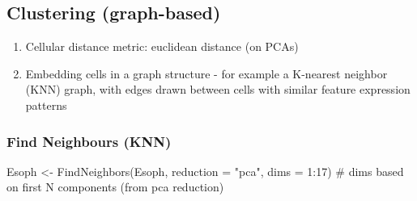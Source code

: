 \documentclass[
  letterpaper,
  DIV=11,
  numbers=noendperiod]{scrreprt}
\newenvironment{Shaded}{\begin{snugshade}}{\end{snugshade}}
\newcommand{\AttributeTok}[1]{\textcolor[rgb]{0.40,0.45,0.13}{#1}}
\newcommand{\CommentTok}[1]{\textcolor[rgb]{0.37,0.37,0.37}{#1}}
\newcommand{\ConstantTok}[1]{\textcolor[rgb]{0.56,0.35,0.01}{#1}}
\newcommand{\ControlFlowTok}[1]{\textcolor[rgb]{0.00,0.23,0.31}{\textbf{#1}}}
\newcommand{\DecValTok}[1]{\textcolor[rgb]{0.68,0.00,0.00}{#1}}
\newcommand{\FloatTok}[1]{\textcolor[rgb]{0.68,0.00,0.00}{#1}}
\newcommand{\FunctionTok}[1]{\textcolor[rgb]{0.28,0.35,0.67}{#1}}
\newcommand{\NormalTok}[1]{\textcolor[rgb]{0.00,0.23,0.31}{#1}}
\newcommand{\OtherTok}[1]{\textcolor[rgb]{0.00,0.23,0.31}{#1}}
\newcommand{\SpecialCharTok}[1]{\textcolor[rgb]{0.37,0.37,0.37}{#1}}
\newcommand{\StringTok}[1]{\textcolor[rgb]{0.13,0.47,0.30}{#1}}
\providecommand{\tightlist}{%
  \setlength{\itemsep}{0pt}\setlength{\parskip}{0pt}}\usepackage{longtable,booktabs,array}
\begin{document}
\begin{Shaded}
\end{Shaded}

\subsection{Clustering (graph-based)}\label{clustering-graph-based}

\begin{enumerate}
\def\labelenumi{\arabic{enumi}.}
\tightlist
\item
  Cellular distance metric: euclidean distance (on PCAs)
\item
  Embedding cells in a graph structure - for example a K-nearest
  neighbor (KNN) graph, with edges drawn between cells with similar
  feature expression patterns
\end{enumerate}

\subsubsection{Find Neighbours (KNN)}\label{find-neighbours-knn}

\begin{Shaded}
\begin{Highlighting}[]
\NormalTok{Esoph }\OtherTok{\textless{}{-}} \FunctionTok{FindNeighbors}\NormalTok{(Esoph, }\AttributeTok{reduction =} \StringTok{"pca"}\NormalTok{, }\AttributeTok{dims =} \DecValTok{1}\SpecialCharTok{:}\DecValTok{17}\NormalTok{) }\CommentTok{\# dims based on first N components (from pca reduction)}
\end{Highlighting}
\end{Shaded}
\end{document}
